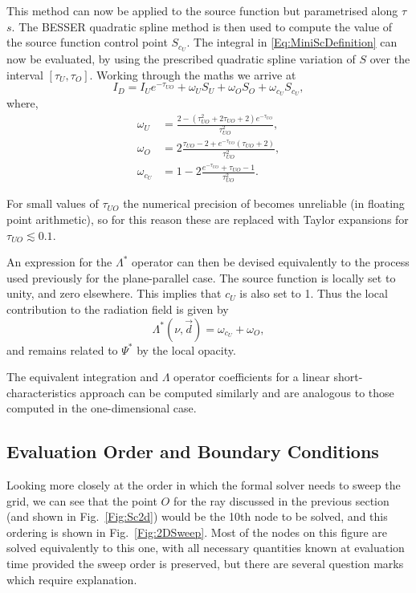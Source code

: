 This method can now be applied to the source function but parametrised along $\tau$  $s$.
The BESSER quadratic spline method is then used to compute the value of the source function control point $S_{c_U}$.
The integral in \eqref{Eq:MiniScDefinition} can now be evaluated, by using the prescribed quadratic spline variation of $S$ over the interval $[\tau_{U}, \tau_{O}]$.
Working through the maths we arrive at
\begin{equation}
    I_D = I_Ue^{-\tau_{UO}} + \omega_U S_U + \omega_O S_O + \omega_{c_U} S_{c_U},
\end{equation}
where,
{
\def\edt{e^{-\tau_{UO}}}
\def\tsq{\tau_{UO}^2}
\begin{align}
    \omega_U &= \frac{2 - (\tsq + 2\tau_{UO} + 2)\edt}{\tsq},\\
    \omega_O &= 2\frac{\tau_{UO} - 2 + \edt (\tau_{UO} + 2)}{\tsq},\\
    \omega_{c_U} &= 1 - 2 \frac{\edt + \tau_{UO} - 1}{\tsq}.
\end{align}
}

For small values of $\tau_{UO}$ the numerical precision of  becomes unreliable (in floating point arithmetic), so for this reason these are replaced with Taylor expansions for $\tau_{UO}\lesssim 0.1$.

An expression for the $\Lambda^*$ operator can then be devised equivalently to the process used previously for the plane-parallel case.
The source function is locally set to unity, and zero elsewhere.
This implies that $c_U$ is also set to 1.
Thus the local contribution to the radiation field is given by
\begin{equation}
    \Lambda^*(\nu, \vec{d}) = \omega_{c_U} + \omega_O,
\end{equation}
and remains related to $\Psi^*$ by the local opacity.

The equivalent integration and $\Lambda$ operator coefficients for a linear short-characteristics approach can be computed similarly and are analogous to those computed in the one-dimensional case.

\subsection{Evaluation Order and Boundary Conditions}\label{Sec:2dEvalOrder}

Looking more closely at the order in which the formal solver needs to sweep the grid, we can see that the point $O$ for the ray discussed in the previous section (and shown in Fig.~\ref{Fig:Sc2d}) would be the 10th node to be solved, and this ordering is shown in Fig.~\ref{Fig:2DSweep}.
Most of the nodes on this figure are solved equivalently to this one, with all necessary quantities known at evaluation time provided the sweep order is preserved, but there are several question marks which require explanation.

